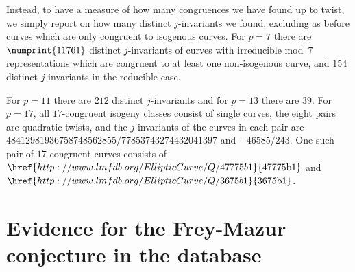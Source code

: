 \documentclass[12pt, reqno]{amsart}
\newcommand{\lmfdbec}[3]{\href{http://www.lmfdb.org/EllipticCurve/Q/#1#2#3}{{\text{\rm#1#2#3}}}}
\numberwithin{equation}{section}
\theoremstyle{definition}
\theoremstyle{remark}
\begin{document}
Instead, to have a measure of how many congruences we have found up to
twist, we simply report on how many distinct $j$-invariants we found,
excluding as before curves which are only congruent to isogenous
curves.  For $p=7$ there are $\numprint{11761}$ distinct
$j$-invariants of curves with irreducible mod~$7$ representations
which are congruent to at least one non-isogenous curve, and $154$
distinct $j$-invariants in the reducible case.

For $p=11$ there are $212$ distinct $j$-invariants and for $p=13$
there are $39$.  For $p=17$, all $17$-congruent isogeny classes
consist of single curves, the eight pairs are quadratic twists, and
the $j$-invariants of the curves in each pair are
$48412981936758748562855/77853743274432041397$ and $-46585/243$.  One
such pair of $17$-congruent curves consists of $\lmfdbec{47775}{b}{1}$
and~$\lmfdbec{3675}{b}{1}$.

\section{Evidence for the Frey-Mazur conjecture in the database}
\label{S:Frey-Mazur}
\end{document}
